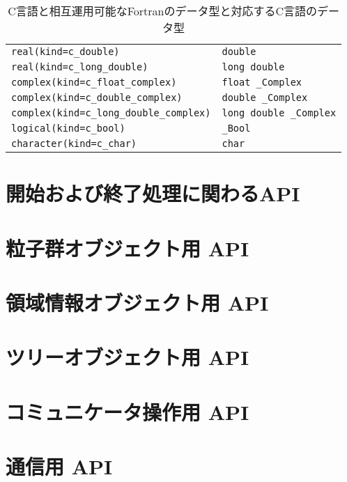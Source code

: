 \documentclass[12pt,a4paper,dvipdfmx]{jbook} %
\begin{document}
\begin{table}[H]
\begin{tabularx}{\linewidth}{XX}
\texttt{real(kind=c\_double)}                   & \texttt{double}\\
\texttt{real(kind=c\_long\_double)}             & \texttt{long double}\\
\texttt{complex(kind=c\_float\_complex)}        & \texttt{float \_Complex}\\
\texttt{complex(kind=c\_double\_complex)}       & \texttt{double \_Complex}\\
\texttt{complex(kind=c\_long\_double\_complex)} & \texttt{long double \_Complex}\\
\texttt{logical(kind=c\_bool)}                  & \texttt{\_Bool}\\
\texttt{character(kind=c\_char)}                & \texttt{char}\\
\bottomrule
\end{tabularx}
\caption{C言語と相互運用可能なFortranのデータ型と対応するC言語のデータ型}
\label{tbl:interoperable_data_types}
\end{table}
\clearpage



\section{開始および終了処理に関わるAPI}
\label{sec:initfin_APIs}

\newpage
\section{粒子群オブジェクト用 API}
\label{sec:psys_APIs}

\newpage
\section{領域情報オブジェクト用 API}
\label{sec:dinfo_APIs}

\newpage
\section{ツリーオブジェクト用 API}
\label{sec:tree_APIs}

\newpage
\section{コミュニケータ操作用 API}
\label{sec:comminfo_APIs}

\newpage
\section{通信用 API}
\label{sec:comm_APIs}

\newpage
\end{document}
